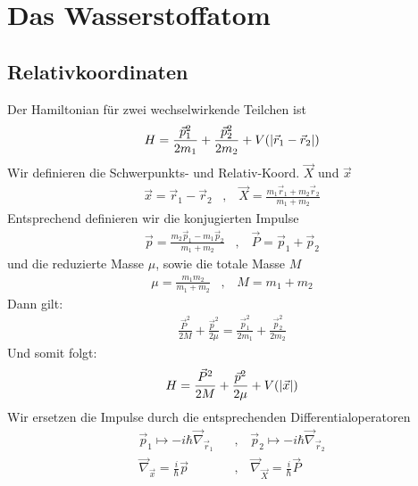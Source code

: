 \section{Das Wasserstoffatom}

\subsection{Relativkoordinaten}

Der Hamiltonian für zwei wechselwirkende Teilchen ist
\begin{align*}
    H = \frac{\vec{p}_1^2}{2 m_1} + \frac{\vec{p}_2^2}{2 m_2} + V(\left\vert \vec{r}_1 - \vec{r}_2 \right\vert)
\end{align*}
Wir definieren die Schwerpunkts- und Relativ-Koord. $\vec{X}$ und $\vec{x}$
\begin{align*}
    \vec{x} = \vec{r}_1 - \vec{r}_2
    \hspace{10pt} , \hspace{10pt}
    \vec{X} = \frac{m_1 \vec{r}_1 + m_2 \vec{r}_2}{m_1 + m_2}
\end{align*}
Entsprechend definieren wir die konjugierten Impulse
\begin{align*}
    \vec{p} = \frac{m_2 \vec{p}_1 - m_1 \vec{p}_2}{m_1 + m_2}
    \hspace{10pt} , \hspace{10pt}
    \vec{P} = \vec{p}_1 + \vec{p}_2
\end{align*}
und die reduzierte Masse $\mu$, sowie die totale Masse $M$
\begin{align*}
    \mu = \frac{m_1 m_2}{m_1 + m_2}
    \hspace{10pt} , \hspace{10pt}
    M = m_1 + m_2
\end{align*}
Dann gilt:
\begin{align*}
    \frac{\vec{P}^2}{2 M} + \frac{\vec{p}^2}{2 \mu}
    = \frac{\vec{p}_1^2}{2 m_1} + \frac{\vec{p}_2^2}{2 m_2}
\end{align*}
Und somit folgt:
\begin{align*}
    H = \frac{\vec{P}^2}{2 M} + \frac{\vec{p}^2}{2 \mu} + V(\left\vert \vec{x} \right\vert)
\end{align*}
Wir ersetzen die Impulse durch die entsprechenden Differentialoperatoren
\begin{align*}
    \vec{p}_1 \mapsto -i \hbar \vec{\nabla}_{\vec{r}_1}
    \hspace{10pt} &, \hspace{10pt}
    \vec{p}_2 \mapsto -i \hbar \vec{\nabla}_{\vec{r}_2}
    \\
    \vec{\nabla}_{\vec{x}} = \frac{i}{\hbar} \vec{p}
    \hspace{10pt} &, \hspace{10pt}
    \vec{\nabla}_{\vec{X}} = \frac{i}{\hbar} \vec{P}
\end{align*}
